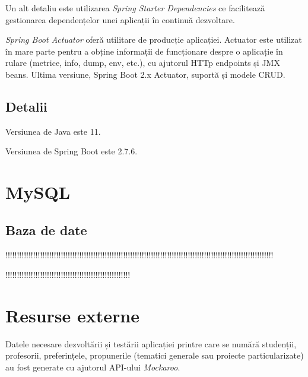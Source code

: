 Un alt detaliu este utilizarea \textit{Spring Starter Dependencies} ce facilitează gestionarea dependențelor unei aplicații în continuă dezvoltare.

\textit{Spring Boot Actuator} oferă utilitare de producție aplicației. Actuator este utilizat în mare parte pentru a obține informații de funcționare despre o aplicație în rulare (metrice, info, dump, env, etc.), cu ajutorul HTTp endpoints și JMX beans.
Ultima versiune, Spring Boot 2.x Actuator, suportă și modele CRUD.

\subsection{Detalii}
Versiunea de Java este 11.

Versiunea de Spring Boot este 2.7.6.

\section{MySQL}
\subsection{Baza de date}

!!!!!!!!!!!!!!!!!!!!!!!!!!!!!!!!!!!!!!!!!!!!!!!!!!!!!!!!!!!!!!!!!!!!!!!!!!!!!!!!!!!!!!!!!!!!!!!!!!!!!!!!!!!!!!!!!!!!

!!!!!!!!!!!!!!!!!!!!!!!!!!!!!!!!!!!!!!!!!!!!!!!!!!!!!!

\section{Resurse externe}
Datele necesare dezvoltării și testării aplicației printre care se numără studenții, profesorii, preferințele, propunerile (tematici generale sau proiecte particularizate) au fost generate cu ajutorul API-ului \textit{Mockaroo}.